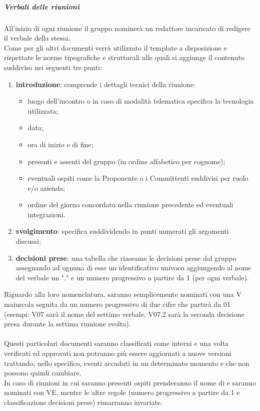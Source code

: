     	\subparagraph{Verbali delle riunioni}
    	All'inizio di ogni riunione il gruppo nominerà un redattore incaricato di redigere il verbale della stessa.\\
    	Come per gli altri documenti verrà utilizzato il template a disposizione e rispettate le norme tipografiche e strutturali alle quali si aggiunge il contenuto suddiviso nei seguenti tre punti:
    	\begin{enumerate}
    		\item \textbf{introduzione}: comprende i dettagli tecnici della riunione:
    		\begin{itemize}
    			\item luogo dell'incontro o in caso di modalità telematica specifica la tecnologia utilizzata;
    			\item data;
    			\item ora di inizio e di fine;
    			\item presenti e assenti del gruppo (in ordine alfabetico per cognome);
    			\item eventuali ospiti come la Proponente o i Committenti suddivisi per ruolo e/o azienda;
    			\item ordine del giorno concordato nella riunione precedente ed eventuali integrazioni.
    		\end{itemize}
    		\item \textbf{svolgimento}: specifica suddividendo in punti numerati gli argomenti discussi;
    		\item \textbf{decisioni prese}: una tabella che riassume le decisioni prese dal gruppo assegnando ad ognuna di esse un identificativo univoco aggiungendo al nome del verbale un "." e un numero progressivo a partire da 1 (per ogni verbale).
    	\end{enumerate}
    	Riguardo alla loro nomenclatura, saranno semplicemente nominati con una V maiuscola seguita da un numero progressivo di due cifre che partirà da 01 (esempi: V07 sarà il nome del settimo verbale, V07.2 sarà la seconda decisione presa durante la settima riunione svolta).\\
    	\\Questi particolari documenti saranno classificati come interni e una volta verificati ed approvati non potranno più essere aggiornati a nuove versioni trattando, nello specifico, eventi accaduti in un determinato momento e che non possono quindi cambiare.
    	\\In caso di riunioni in cui saranno presenti ospiti prenderanno il nome di  e saranno nominati con VE, mentre le altre regole (numero progressivo a partire da 1 e classificazione decisioni prese) rimarranno invariate.

